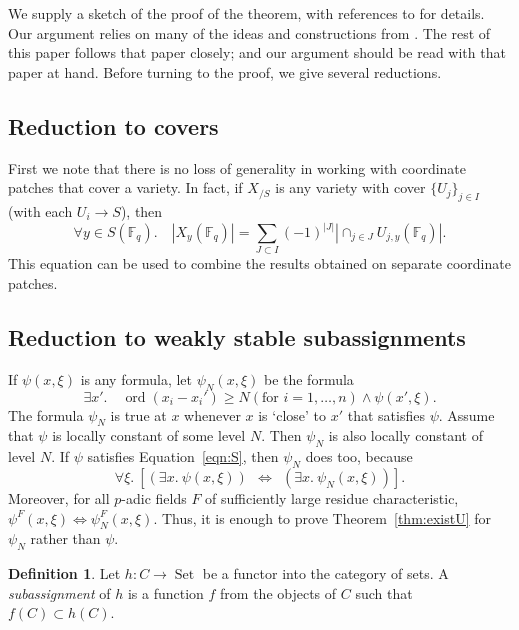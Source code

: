 \documentclass[11pt]{amsart}
\theoremstyle{definition}
\newtheorem{definition}[theorem]{Definition}
\theoremstyle{remark}
\numberwithin{equation}{theorem}
\def\f{{\mathbb{F}_q}}
\def\op#1{\operatorname{#1}}
\begin{document}
We supply a sketch of the proof of the theorem, with references to
\cite{DLD} for details.  Our argument relies on many of the ideas
and constructions from \cite{DLD}.  The rest of this paper follows
that paper closely; and our argument should be read with that
paper at hand. Before turning to the proof, we give several
reductions.

\subsection{Reduction to covers} First we note that there is no
loss of generality in working with coordinate patches that cover a
variety.  In fact, if $X_{/S}$ is any variety with cover
$\{U_j\}_{j\in I}$ (with each $U_i\to S$), then
   \begin{equation}
   \forall y\in S(\f).\quad
   |X_y(\f)| = \sum_{J\subset I} (-1)^{|J|} |\cap_{j\in J} U_{j,y}(\f)|.
   \end{equation}
This equation can be used to combine the results obtained on
separate coordinate patches.

\subsection{Reduction to weakly stable subassignments} If
$\psi(x,\xi)$ is any formula, let $\psi_N(x,\xi)$ be the formula
    \begin{equation}
    \exists x'.\quad \op{ord}(x_i-x_i')\ge N (\text{for } i=1,\ldots,n)
    \land \psi(x',\xi).
    \end{equation}
The formula $\psi_N$ is true at $x$ whenever $x$ is `close' to
$x'$ that satisfies $\psi$.  Assume that $\psi$ is locally
constant of some level $N$.  Then $\psi_N$ is also locally
constant of level $N$.  If $\psi$ satisfies Equation~\ref{eqn:S},
then $\psi_N$ does too, because
    \begin{equation}
    \forall \xi.\ [
    (\exists x.~
    \psi(x,\xi))~~\Leftrightarrow~~
    (\exists x.~\psi_N(x,\xi))].
    \end{equation}
Moreover, for all $p$-adic fields $F$ of sufficiently large
residue characteristic, $\psi^F(x,\xi)\Leftrightarrow
\psi_N^F(x,\xi)$.  Thus, it is enough to prove
Theorem~\ref{thm:existU} for $\psi_N$ rather than $\psi$.

\begin{definition}
Let $h:C\to\op{Set}$ be a functor into the category of sets.  A
{\it subassignment\/} of $h$ is a function $f$ from the objects of
$C$ such that $f(C)\subset h(C)$.
\end{definition}
\end{document}
